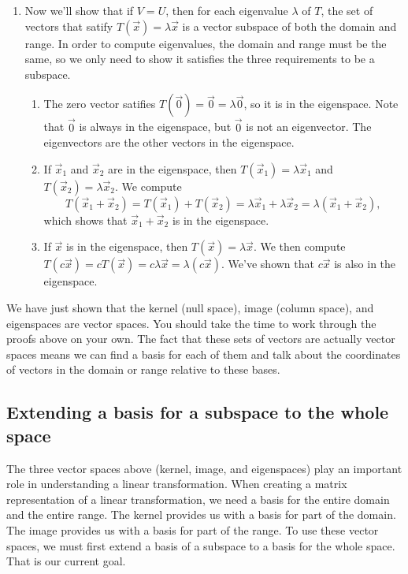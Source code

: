 \begin{example}
\begin{enumerate}
	\item Now we'll show that if $V=U$, then for each eigenvalue $\lambda$ of $T$, the set of vectors that satify $T(\vec x) = \lambda \vec x$ is a vector subspace of both the domain and range.  In order to compute eigenvalues, the domain and range must be the same, so we only need to show it satisfies the three requirements to be a subspace.
\begin{enumerate}
	\item The zero vector satifies $T(\vec 0) = \vec 0 = \lambda \vec 0$, so it is in the eigenspace.  Note that $\vec 0$ is always in the eigenspace, but $\vec 0$ is not an eigenvector. The eigenvectors are the other vectors in the eigenspace.
	\item If $\vec x_1$ and $\vec x_2$ are in the eigenspace, then $T(\vec x_1)=\lambda \vec x_1$ and $T(\vec x_2)=\lambda \vec x_2$. We compute $$T(\vec x_1+\vec x_2)=T(\vec x_1)+T(\vec x_2)=\lambda \vec x_1+\lambda \vec x_2 = \lambda (\vec x_1+\vec x_2),$$ which shows that $\vec x_1+\vec x_2$ is in the eigenspace.
	\item If $\vec x$ is in the eigenspace, then $T(\vec x)=\lambda \vec x$. We then compute $T(c\vec x)=cT(\vec x)=c\lambda \vec x= \lambda (c\vec x)$. We've shown that $c\vec x$ is also in the eigenspace.
\end{enumerate}
\end{enumerate}
We have just shown that the kernel (null space), image (column space), and eigenspaces are vector spaces. You should take the time to work through the proofs above on your own. The fact that these sets of vectors are actually vector spaces means we can find a basis for each of them and talk about the coordinates of vectors in the domain or range relative to these bases.
\end{example}



\subsection{Extending a basis for a subspace to the whole space}
The three vector spaces above (kernel, image, and eigenspaces) play an important role in understanding a linear transformation. When creating a matrix representation of a linear transformation, we need a basis for the entire domain and the entire range.  The kernel provides us with a basis for part of the domain. The image provides us with a basis for part of the range.  To use these vector spaces, we must first extend a basis of a subspace to a basis for the whole space.  That is our current goal.


